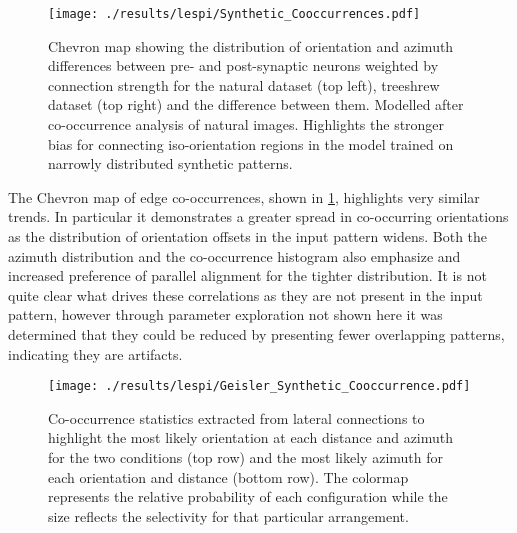 \begin{figure}
	\centering
        \texttt{[image: ./results/lespi/Synthetic\_Cooccurrences.pdf]}
	\caption[Chevron map showing the distribution of orientation and
      azimuth differences between pre- and post-synaptic
      neurons.]{Chevron map showing the distribution of orientation
      and azimuth differences between pre- and post-synaptic neurons
      weighted by connection strength for the natural dataset (top
      left), treeshrew dataset (top right) and the difference between
      them. Modelled after \cite{Perrinet2015} co-occurrence analysis
      of natural images. Highlights the stronger bias for connecting
      iso-orientation regions in the model trained on narrowly
      distributed synthetic patterns.}
	\label{SyntheticCooccurrence}
\end{figure}

The Chevron map of edge co-occurrences, shown in
\ref{SyntheticCooccurrence}, highlights very similar trends. In
particular it demonstrates a greater spread in co-occurring
orientations as the distribution of orientation offsets in the input
pattern widens. Both the azimuth distribution and the co-occurrence
histogram also emphasize and increased preference of parallel
alignment for the tighter distribution. It is not quite clear what
drives these correlations as they are not present in the input
pattern, however through parameter exploration not shown here it was
determined that they could be reduced by presenting fewer overlapping
patterns, indicating they are artifacts.

\begin{figure}
	\centering
    \texttt{[image: ./results/lespi/Geisler\_Synthetic\_Cooccurrence.pdf]}
	\caption{Co-occurrence statistics extracted from lateral
      connections to highlight the most likely orientation at each
      distance and azimuth for the two conditions (top row) and the
      most likely azimuth for each orientation and distance (bottom
      row). The colormap represents the relative probability of each
      configuration while the size reflects the selectivity for that
      particular arrangement.}
	\label{SyntheticGeisler}
\end{figure}

